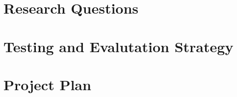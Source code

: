 \documentclass[12pt]{report}
\begin{document}


\chapter{Research Questions}


\chapter{Testing and Evalutation Strategy}


\chapter{Project Plan}

\end{document}
